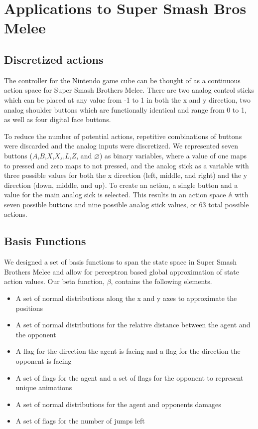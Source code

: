 \section{Applications to Super Smash Bros Melee}

\subsection{Discretized actions}
The controller for the Nintendo game cube can be thought of as a continuous action space for Super Smash Brothers Melee. There are two analog control sticks which can be placed at any value from -1 to 1 in both the x and y direction, two analog shoulder buttons which are functionally identical and range from 0 to 1, as well as four digital face buttons. 

To reduce the number of potential actions, repetitive combinations of buttons were discarded and the analog inputs were discretized. We represented seven buttons ($A$,$B$,$X$,$X_{s}$,$L$,$Z$, and $\varnothing$) as binary variables, where a value of one maps to pressed and zero maps to not pressed, and the analog stick as a variable with three possible values for both the x direction (left, middle, and right) and the y direction (down, middle, and up). To create an action, a single button and a value for the main analog sick is selected. This results in an action space $\mathbb{A}$ with seven possible buttons and nine possible analog stick values, or 63 total possible actions.

\subsection{Basis Functions}
We designed a set of basis functions to span the state space in Super Smash Brothers Melee and allow for perceptron based global approximation of state action values. Our beta function, $\beta$, contains the following elements.

\begin{itemize}
\item A set of normal distributions along the x and y axes to approximate the positions
\item A set of normal distributions for the relative distance between the agent and the opponent
\item A flag for the direction the agent is facing and a flag for the direction the opponent is facing
\item A set of flags for the agent and a set of flags for the opponent to represent unique animations
\item A set of normal distributions for the agent and opponents damages
\item A set of flags for the number of jumps left
\end{itemize}

